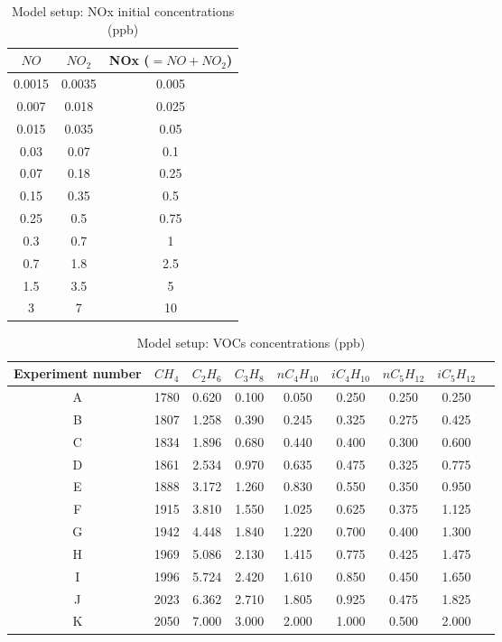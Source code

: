 \documentclass[11pt,a4paper]{article}
\begin{document}
\begin{table} %
\caption{Model setup: NOx initial concentrations (ppb)}\label{tab:setupNOx}
\centering
\begin{tabular}{ccc}
\hline
$NO$      & $NO_2$      & NOx  ($=NO+NO_2$) \\
\hline
0.0015    & 0.0035      & 0.005 \\
0.007     & 0.018       & 0.025 \\
0.015     & 0.035       & 0.05  \\
0.03      & 0.07        & 0.1   \\
0.07      & 0.18        & 0.25  \\
0.15      & 0.35        & 0.5   \\
0.25      & 0.5         & 0.75  \\
0.3       & 0.7         & 1     \\
0.7       & 1.8         & 2.5   \\
1.5       & 3.5         & 5     \\
3         & 7           & 10    \\
\hline
\end{tabular}
\end{table}	

\begin{table} %
\caption{Model setup: VOCs concentrations (ppb)}\label{tab:setupVOCs}
\centering
\begin{tabular}{ccccccccc}
\hline
Experiment number & $CH_4$ & $C_2H_6$ & $C_3H_8$ & $nC_4H_{10}$ & $iC_4H_{10}$ & $nC_5H_{12}$ & $iC_5H_{12}$ \\
\hline
A  & 1780 &	0.620 &	0.100 &	0.050 &	0.250 &	0.250 &	0.250 \\
B  & 1807 &	1.258 &	0.390 &	0.245 &	0.325 &	0.275 &	0.425 \\
C  & 1834 &	1.896 &	0.680 &	0.440 &	0.400 &	0.300 &	0.600 \\
D  & 1861 &	2.534 &	0.970 &	0.635 &	0.475 &	0.325 &	0.775 \\
E  & 1888 &	3.172 &	1.260 &	0.830 &	0.550 &	0.350 &	0.950 \\
F  & 1915 &	3.810 &	1.550 &	1.025 &	0.625 &	0.375 &	1.125 \\
G  & 1942 &	4.448 &	1.840 &	1.220 &	0.700 &	0.400 &	1.300 \\
H  & 1969 &	5.086 &	2.130 &	1.415 &	0.775 &	0.425 &	1.475 \\
I  & 1996 &	5.724 &	2.420 &	1.610 &	0.850 &	0.450 &	1.650 \\
J  & 2023 &	6.362 &	2.710 &	1.805 &	0.925 &	0.475 &	1.825 \\
K  & 2050 &	7.000 &	3.000 &	2.000 &	1.000 &	0.500 &	2.000 \\
\hline
\end{tabular}
\end{table}
\end{document}
